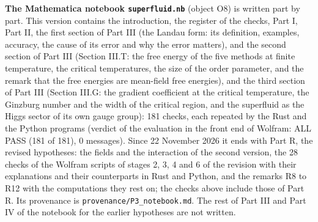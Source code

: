 \documentclass[
  10pt,
]{article}
\begin{document}
\textbf{The Mathematica notebook \texttt{superfluid.nb}} (object O8) is
written part by part. This version contains the introduction, the
register of the checks, Part I, Part II, the first section of Part III
(the Landau form: its definition, examples, accuracy, the cause of its
error and why the error matters), and the second section of Part III
(Section III.T: the free energy of the five methods at finite
temperature, the critical temperatures, the size of the order parameter,
and the remark that the free energies are mean-field free energies), and
the third section of Part III (Section III.G: the gradient coefficient
at the critical temperature, the Ginzburg number and the width of the
critical region, and the superfluid as the Higgs sector of its own gauge
group): 181 checks, each repeated by the Rust and the Python programs
(verdict of the evaluation in the front end of Wolfram: ALL PASS (181 of
181), 0 messages). Since 22 November 2026 it ends with Part R, the
revised hypotheses: the fields and the interaction of the second
version, the 28 checks of the Wolfram scripts of stages 2, 3, 4 and 6 of
the revision with their explanations and their counterparts in Rust and
Python, and the remarks R8 to R12 with the computations they rest on;
the checks above include those of Part R. Its provenance is
\texttt{provenance/P3\_notebook.md}. The rest of Part III and Part IV of
the notebook for the earlier hypotheses are not written.
\end{document}
